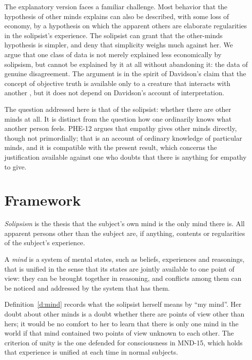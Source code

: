\documentclass{situationist-preprint}
\begin{document}
The explanatory version faces a familiar challenge. Most behavior that the hypothesis of other minds explains can also be described, with some loss of economy, by a hypothesis on which the apparent others are elaborate regularities in the solipsist's experience. The solipsist can grant that the other-minds hypothesis is simpler, and deny that simplicity weighs much against her. We argue that one class of data is not merely explained less economically by solipsism, but cannot be explained by it at all without abandoning it: the data of genuine disagreement. The argument is in the spirit of Davidson's claim that the concept of objective truth is available only to a creature that interacts with another \citep{Davidson1991}, but it does not depend on Davidson's account of interpretation.

The question addressed here is that of the solipsist: whether there are other minds at all. It is distinct from the question how one ordinarily knows what another person feels. PHE-12 argues that empathy gives other minds directly, though not primordially; that is an account of ordinary knowledge of particular minds, and it is compatible with the present result, which concerns the justification available against one who doubts that there is anything for empathy to give.

\section{Framework}

\begin{definition}[Solipsism]\label{d:sol}
\emph{Solipsism} is the thesis that the subject's own mind is the only mind there is. All apparent persons other than the subject are, if anything, contents or regularities of the subject's experience.
\end{definition}

\begin{definition}[Mind]\label{d:mind}
A \emph{mind} is a system of mental states, such as beliefs, experiences and reasonings, that is unified in the sense that its states are jointly available to one point of view: they can be brought together in reasoning, and conflicts among them can be noticed and addressed by the system that has them.
\end{definition}

Definition~\ref{d:mind} records what the solipsist herself means by \enquote{my mind}. Her doubt about other minds is a doubt whether there are points of view other than hers; it would be no comfort to her to learn that there is only one mind in the world if that mind contained two points of view unknown to each other. The criterion of unity is the one defended for consciousness in MND-15, which holds that experience is unified at each time in normal subjects.
\end{document}
